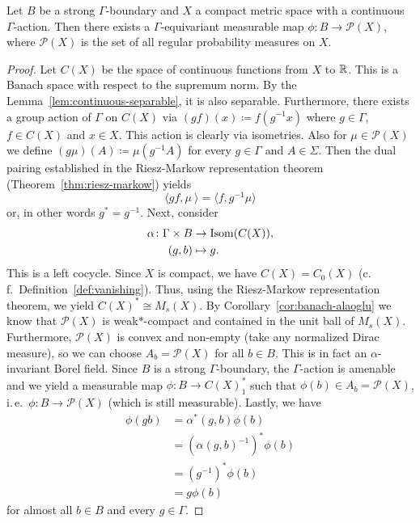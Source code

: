 \begin{thm}
  \label{thm:p(x)}
  Let \(B\) be a strong \(\Gamma\)-boundary and \(X\) a compact metric space with a continuous \(\Gamma\)-action. Then there exists a \(\Gamma\)-equivariant measurable map \(\phi \colon B \to \mathcal{P}(X)\), where \(\mathcal{P}(X)\) is the set of all regular probability measures on \(X\).
\end{thm}

\begin{proof}
  Let \(C(X)\) be the space of continuous functions from \(X\) to \(\mathbb{R}\).  This is a Banach space with respect to the supremum norm. By the Lemma~\ref{lem:continuous-separable}, it is also separable. Furthermore, there exists a group action of \(\Gamma\) on \(C(X)\) via \((gf)(x) \coloneqq f(g^{-1}x)\) where \(g \in \Gamma\), \(f \in C(X)\) and \(x \in X\). This action is clearly via isometries. Also for \(\mu \in \mathcal{P}(X)\) we define \((g\mu)(A) \coloneqq \mu(g^{-1} A)\) for every \(g \in \Gamma\) and \(A \in \Sigma\). Then the dual pairing established in the Riesz-Markow representation theorem (Theorem~\ref{thm:riesz-markow}) yields
  \[
    \langle gf, \mu\ \rangle = \langle f, g^{-1} \mu \rangle
  \]
  or, in other words \(g^\ast = g^{-1}\).
  Next, consider
  \begin{align*}
    \alpha\colon \Gamma \times B &\to \operatorname{Isom}(C(X)),\\
                 (g, b) &\mapsto g.
  \end{align*}
  This is a left cocycle.
  Since \(X\) is compact, we have \(C(X) = C_0(X)\) (c.\,f.\ Definition~\ref{def:vanishing}). Thus, using the Riesz-Markow representation theorem, we yield \(C(X)^\ast \cong M_{s}(X)\). By Corollary~\ref{cor:banach-alaoglu} we know that \(\mathcal{P}(X)\) is weak\(\ast\)-compact and contained in the unit ball of \(M_s(X)\). Furthermore, \(\mathcal{P}(X)\) is convex and non-empty (take any normalized Dirac measure), so we can choose \(A_b = \mathcal{P}(X)\) for all \(b \in B\). This is in fact an \(\alpha\)-invariant Borel field. Since \(B\) is a strong \(\Gamma\)-boundary, the \(\Gamma\)-action is amenable and we yield a measurable map \(\phi \colon B \to C(X)^\ast_1\) such that \(\phi(b) \in A_b = \mathcal{P}(X)\), i.\,e.\ \(\phi \colon B \to \mathcal{P}(X)\) (which is still measurable). Lastly, we have
  \begin{align*}
    \phi(gb) & = \alpha^\ast(g, b) \phi(b)\\
               & = \left(\alpha(g,b)^{-1}\right)^\ast \phi(b)\\
               & = \left ( g^{-1}\right)^\ast \phi(b)\\
               & = g\phi(b)
  \end{align*}
  for almost all \(b \in B\) and every \(g \in \Gamma\).
\end{proof}

